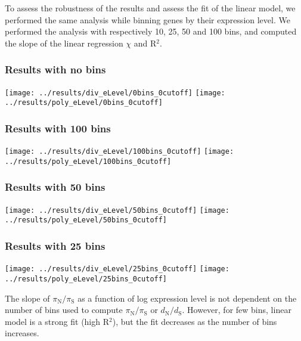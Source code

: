 \documentclass[10pt]{article}
\newcommand{\dn}{d_{\text{N}}}
\newcommand{\ds}{d_{\text{S}}}
\newcommand{\dnds}{\dn / \ds}
\newcommand{\pin}{\pi_{\text{N}}}
\newcommand{\pis}{\pi_{\text{S}}}
\newcommand{\pinpis}{\pin / \pis}
\begin{document}
    To assess the robustness of the results and assess the fit of the linear model, we performed the same analysis while binning genes by their expression level.
    We performed the analysis with respectively 10, 25, 50 and 100 bins, and computed the slope of the linear regression $\chi$ and R$^2$.

    \subsubsection{Results with no bins}
    \begin{center}
        \texttt{[image: ../results/div\_eLevel/0bins\_0cutoff]}
        \texttt{[image: ../results/poly\_eLevel/0bins\_0cutoff]}
    \end{center}

    \subsubsection{Results with 100 bins}
    \begin{center}
        \texttt{[image: ../results/div\_eLevel/100bins\_0cutoff]}
        \texttt{[image: ../results/poly\_eLevel/100bins\_0cutoff]}
    \end{center}

    \subsubsection{Results with 50 bins}
    \begin{center}
        \texttt{[image: ../results/div\_eLevel/50bins\_0cutoff]}
        \texttt{[image: ../results/poly\_eLevel/50bins\_0cutoff]}
    \end{center}

    \subsubsection{Results with 25 bins}
    \begin{center}
        \texttt{[image: ../results/div\_eLevel/25bins\_0cutoff]}
        \texttt{[image: ../results/poly\_eLevel/25bins\_0cutoff]}
    \end{center}

    The slope of $\pinpis$ as a function of log expression level is not dependent on the number of bins used to compute $\pinpis$ or $\dnds$.
    However, for few bins, linear model is a strong fit (high R$^2$), but the fit decreases as the number of bins increases.
\end{document}
